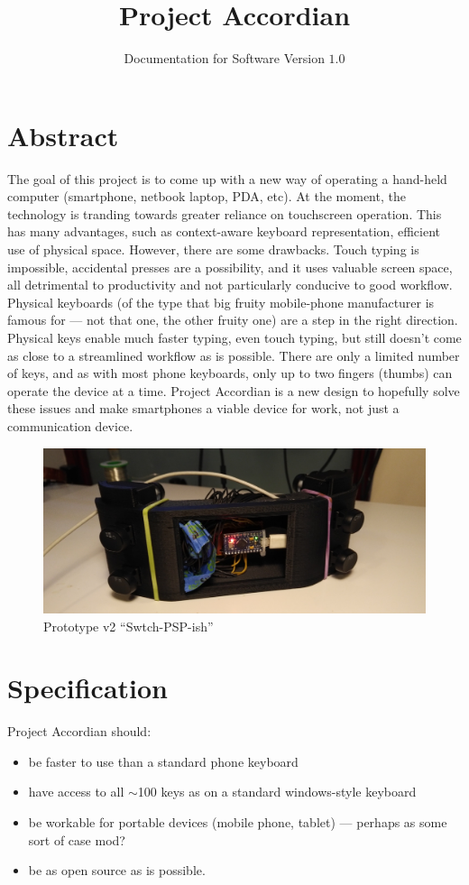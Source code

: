 \documentclass{article}
\title{Project Accordian}
\author{Documentation for Software Version $1.0$}
\begin{document}
\maketitle

\section{Abstract}
The goal of this project is to come up with a new way of operating a hand-held computer (smartphone, netbook laptop, PDA, etc). At the moment, the technology is tranding towards greater reliance on touchscreen operation. This has many advantages, such as context-aware keyboard representation, efficient use of physical space. However, there are some drawbacks. Touch typing is impossible, accidental presses are a possibility, and it uses valuable screen space, all detrimental to productivity and not particularly conducive to good workflow. Physical keyboards (of the type that big fruity mobile-phone manufacturer is famous for --- not that one, the other fruity one) are a step in the right direction. Physical keys enable much faster typing, even touch typing, but still doesn't come as close to a streamlined workflow as is possible. There are only a limited number of keys, and as with most phone keyboards, only up to two fingers (thumbs) can operate the device at a time. Project Accordian is a new design to hopefully solve these issues and make smartphones a viable device for work, not just a communication device.

\begin{figure}[!h]
	\centering
	\includegraphics[width=.6\textwidth]{imgs/5_pro3.jpg}
	\caption{\label{proto2} Prototype v2 ``Swtch-PSP-ish''}
\end{figure}

\section{Specification}
Project Accordian should:
\begin{itemize}
	\item be faster to use than a standard phone keyboard
	\item have access to all $\sim$100 keys as on a standard windows-style keyboard
	\item be workable for portable devices (mobile phone, tablet) --- perhaps as some sort of case mod?
	\item be as open source as is possible.
\end{itemize}
\end{document}
